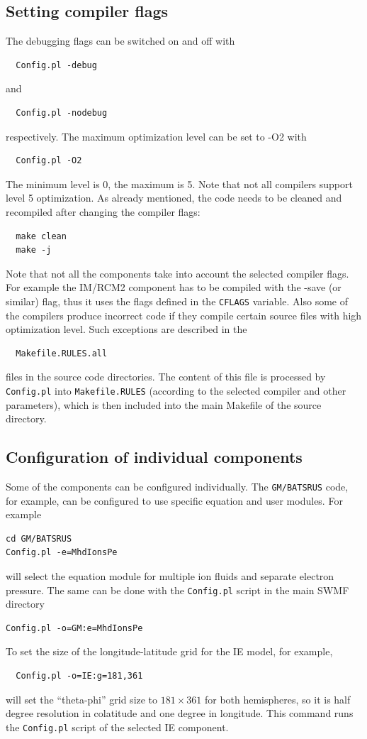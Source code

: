 \subsection{Setting compiler flags}

The debugging flags can be switched on and off with
\begin{verbatim}
  Config.pl -debug
\end{verbatim}
and
\begin{verbatim}
  Config.pl -nodebug
\end{verbatim}
respectively. The maximum optimization level can be set to -O2 with
\begin{verbatim}
  Config.pl -O2
\end{verbatim}
The minimum level is 0, the maximum is 5. Note that not all compilers support
level 5 optimization. As already mentioned, the code needs to be cleaned 
and recompiled after changing the compiler flags:
\begin{verbatim}
  make clean
  make -j
\end{verbatim}
Note that not all the components take into account the selected
compiler flags. For example the IM/RCM2 component has to be compiled 
with the -save (or similar) flag, thus it uses the flags defined in the 
{\tt CFLAGS} variable. Also some of the compilers produce incorrect
code if they compile certain source files with high optimization level.
Such exceptions are described in the 
\begin{verbatim}
  Makefile.RULES.all
\end{verbatim}
files in the source code directories. The content of this file
is processed by {\tt Config.pl} into {\tt Makefile.RULES}
(according to the selected compiler and other parameters),  
which is then included into the main Makefile of the source
directory.

\subsection{Configuration of individual components}

Some of the components can be configured individually. 
The {\tt GM/BATSRUS} code, for example, can be configured to
use specific equation and user modules.
For example
\begin{verbatim}
cd GM/BATSRUS
Config.pl -e=MhdIonsPe
\end{verbatim}
will select the equation module for multiple ion fluids and separate
electron pressure. The same can be done with the {\tt Config.pl} script
in the main SWMF directory
\begin{verbatim}
Config.pl -o=GM:e=MhdIonsPe
\end{verbatim}
To set the size of the longitude-latitude grid for the IE model, for example, 
\begin{verbatim}
  Config.pl -o=IE:g=181,361
\end{verbatim}
will set the ``theta-phi'' grid size to $181\times 361$ for both hemispheres,
so it is half degree resolution in colatitude and one degree in longitude.
This command runs the {\tt Config.pl} script of the selected IE component. 

